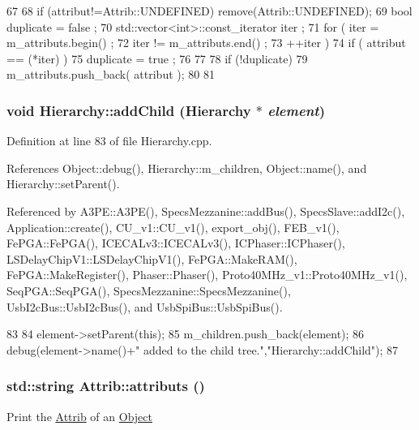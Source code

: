 \begin{DoxyCode}
67                             {
68     if (attribut!=Attrib::UNDEFINED) remove(Attrib::UNDEFINED);
69     bool duplicate = false ;
70     std::vector<int>::const_iterator iter ;
71     for ( iter  = m_attributs.begin() ;
72           iter != m_attributs.end()   ;
73           ++iter ) {
74       if ( attribut == (*iter) ) {
75         duplicate = true ;
76       }
77     }
78     if (!duplicate) {
79       m_attributs.push_back( attribut );
80     }
81   }
\end{DoxyCode}
\hypertarget{classHierarchy_ad677774ff38fcb257c04a3a10d471fac}{
\subsubsection[{addChild}]{\setlength{\rightskip}{0pt plus 5cm}void Hierarchy::addChild ({\bf Hierarchy} $\ast$ {\em element})}}
\label{classHierarchy_ad677774ff38fcb257c04a3a10d471fac}


Definition at line 83 of file Hierarchy.cpp.

References Object::debug(), Hierarchy::m\_\-children, Object::name(), and Hierarchy::setParent().

Referenced by A3PE::A3PE(), SpecsMezzanine::addBus(), SpecsSlave::addI2c(), Application::create(), CU\_\-v1::CU\_\-v1(), export\_\-obj(), FEB\_\-v1(), FePGA::FePGA(), ICECALv3::ICECALv3(), ICPhaser::ICPhaser(), LSDelayChipV1::LSDelayChipV1(), FePGA::MakeRAM(), FePGA::MakeRegister(), Phaser::Phaser(), Proto40MHz\_\-v1::Proto40MHz\_\-v1(), SeqPGA::SeqPGA(), SpecsMezzanine::SpecsMezzanine(), UsbI2cBus::UsbI2cBus(), and UsbSpiBus::UsbSpiBus().


\begin{DoxyCode}
83                                           {
84   element->setParent(this);
85   m_children.push_back(element);
86   debug(element->name()+" added to the child tree.","Hierarchy::addChild");
87 }
\end{DoxyCode}
\hypertarget{classAttrib_aee7bbf16b144887f196e1341b24f8a26}{
\subsubsection[{attributs}]{\setlength{\rightskip}{0pt plus 5cm}std::string Attrib::attributs ()}}
\label{classAttrib_aee7bbf16b144887f196e1341b24f8a26}
Print the \hyperlink{classAttrib}{Attrib} of an \hyperlink{classObject}{Object} 

